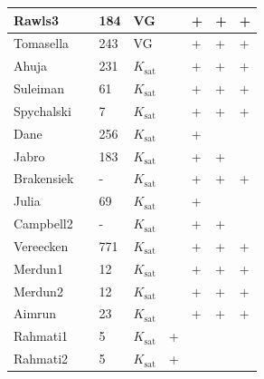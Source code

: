 \begin{landscape}
\begin{ThreePartTable}
\begin{center}
\begin{longtable}{p{2cm}<{\centering}p{4cm}<{\centering}p{2cm}<{\centering}p{2.8cm}<{\centering}p{2cm}<{\centering}p{2cm}<{\centering}p{2cm}<{\centering}p{2cm}<{\centering}}
        Rawls3       & \citet{Rawls_Brakensiek_1983}   & 184  & VG                                 &   & + & + & + \\ \hline
        Tomasella    & \citet{Tomasella_Hodnett_1998}  & 243  & VG                                 &   & + & + & + \\ \hline
        Ahuja        & \citet{Ahuja_1989}              & 231  & $K_{\mathrm {sat}} $               &   & + & + & + \\ \hline
        Suleiman     & \citet{Suleiman_2001}           & 61   & $K_{\mathrm {sat}} $               &   & + & + & + \\ \hline
        Spychalski   & \citet{Spychalski_2007}         & 7    & $K_{\mathrm {sat}} $               &   & + & + & + \\ \hline
        Dane         & \citet{Dane_Puckett_1994}       & 256  & $K_{\mathrm {sat}} $               &   & + &   &   \\ \hline
        Jabro        & \citet{Jabro_1992}              & 183  & $K_{\mathrm {sat}} $               &   & + & + &   \\ \hline
        Brakensiek   & \citet{Brakensiek_1984}         & -    & $K_{\mathrm {sat}} $               &   & + & + & + \\ \hline
        Julia        & \citet{Julia_2004}              & 69   & $K_{\mathrm {sat}} $               &   & + &   &   \\ \hline
        Campbell2    & \citet{Campbell_1985}           & -    & $K_{\mathrm {sat}} $               &   & + & + &   \\ \hline
        Vereecken    & \citet{Vereecken_Maes_1990}     & 771  & $K_{\mathrm {sat}} $               &   & + & + & + \\ \hline
        Merdun1      & \citet{Merdun_2010}             & 12   & $K_{\mathrm {sat}} $               &   & + & + & + \\ \hline
        Merdun2      & \citet{Merdun_2010}             & 12   & $K_{\mathrm {sat}} $               &   & + & + & + \\ \hline
        Aimrun       & \citet{Aimrun_2009}             & 23   & $K_{\mathrm {sat}} $               &   & + & + & + \\ \hline
        Rahmati1     & \citet{Rahmati_2018}            & 5    & $K_{\mathrm {sat}} $               & + &   &   &   \\ \hline
        Rahmati2     & \citet{Rahmati_2018}            & 5    & $K_{\mathrm {sat}} $               & + &   &   &   \\
      \end{longtable}
    \end{center}
  \end{ThreePartTable}
\end{landscape}
